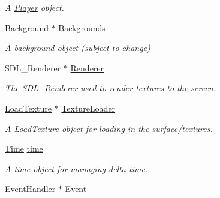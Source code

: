 \begin{DoxyCompactItemize}
\begin{DoxyCompactList}\small\item\em A \hyperlink{class_player}{Player} object. \end{DoxyCompactList}\item 
\hypertarget{class_application_a4678ca860a3791b2d09ef777fbdb3167}{\hyperlink{class_background}{Background} $\ast$ \hyperlink{class_application_a4678ca860a3791b2d09ef777fbdb3167}{Backgrounds}}\label{class_application_a4678ca860a3791b2d09ef777fbdb3167}

\begin{DoxyCompactList}\small\item\em A background object (subject to change) \end{DoxyCompactList}\item 
\hypertarget{class_application_af90aee2b6a03b1b1b1d7b9f06b622585}{S\+D\+L\+\_\+\+Renderer $\ast$ \hyperlink{class_application_af90aee2b6a03b1b1b1d7b9f06b622585}{Renderer}}\label{class_application_af90aee2b6a03b1b1b1d7b9f06b622585}

\begin{DoxyCompactList}\small\item\em The S\+D\+L\+\_\+\+Renderer used to render textures to the screen. \end{DoxyCompactList}\item 
\hypertarget{class_application_a9a357975280488b775fda3f363ec556d}{\hyperlink{class_load_texture}{Load\+Texture} $\ast$ \hyperlink{class_application_a9a357975280488b775fda3f363ec556d}{Texture\+Loader}}\label{class_application_a9a357975280488b775fda3f363ec556d}

\begin{DoxyCompactList}\small\item\em A \hyperlink{class_load_texture}{Load\+Texture} object for loading in the surface/textures. \end{DoxyCompactList}\item 
\hypertarget{class_application_a5b3b987a58f1ff2cd672c52f05a46b2f}{\hyperlink{class_time}{Time} \hyperlink{class_application_a5b3b987a58f1ff2cd672c52f05a46b2f}{time}}\label{class_application_a5b3b987a58f1ff2cd672c52f05a46b2f}

\begin{DoxyCompactList}\small\item\em A time object for managing delta time. \end{DoxyCompactList}\item 
\hypertarget{class_application_a31d4246ee49a814ca3110f3e51ccd03f}{\hyperlink{class_event_handler}{Event\+Handler} $\ast$ \hyperlink{class_application_a31d4246ee49a814ca3110f3e51ccd03f}{Event}}\label{class_application_a31d4246ee49a814ca3110f3e51ccd03f}


\end{DoxyCompactItemize}
